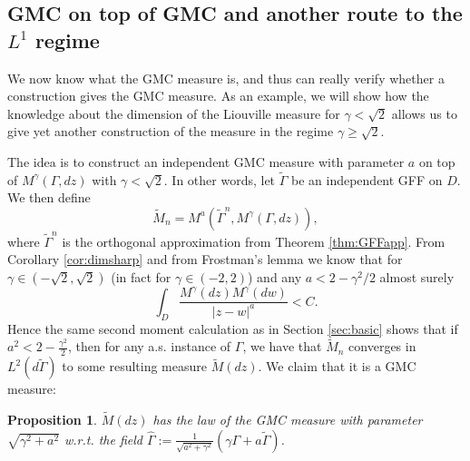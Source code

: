 \documentclass[11pt]{amsart}
\newtheorem{prop}[thm]{Proposition}
\renewcommand{\1}{\mathbf 1}
\begin{document}
\subsection{GMC on top of GMC and another route to the $L^1$ regime}

We now know what the GMC measure is, and thus can really verify whether a construction gives the GMC measure. As an example, we will show how the knowledge about the dimension of the Liouville measure for $\gamma < \sqrt{2}$ allows us to give yet another construction of the measure in the regime $\gamma \geq \sqrt{2}$. 

The idea is to construct an independent GMC measure with parameter $a$ on top of  $M^\gamma(\Gamma, dz)$ with $\gamma < \sqrt{2}$. In other words, let $\tilde \Gamma$ be an independent GFF on $D$. We then define $$\widetilde M_n = M^a(\tilde \Gamma^n, M^\gamma(\Gamma,dz)),$$
where $\tilde \Gamma^n$ is the orthogonal approximation from Theorem \ref{thm:GFFapp}. 
From Corollary \ref{cor:dimsharp} and from Frostman's lemma we know that for $\gamma \in (-\sqrt{2}, \sqrt{2})$ (in fact for $\gamma \in (-2,2)$) and any $a < 2-\gamma^2/2$ almost surely $$\int_D \frac{M^\gamma(dz)M^\gamma(dw)}{|z-w|^a} < C.$$ 
Hence the same second moment calculation as in Section \ref{sec:basic} shows that if $a^2 < 2 -\frac{\gamma^2}{2}$, then for any a.s. instance of $\Gamma$, we have that $\widetilde M_n$ converges in $L^2(d\tilde \Gamma)$ to some resulting measure $\widetilde M(dz)$. We claim that it is a GMC measure:
\begin{prop}
$\widetilde M(dz)$ has the law of the GMC measure with parameter $\sqrt{\gamma^2 + a^2}$ w.r.t. the field $\widehat \Gamma := \frac{1}{\sqrt{a^2 + \gamma^2}} (\gamma \Gamma +a \tilde \Gamma)$. 
\end{prop}
\end{document}
